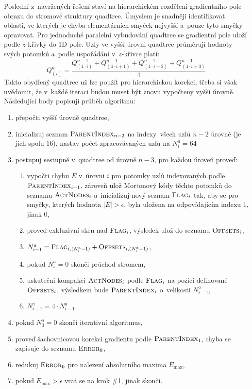 \documentclass[11pt,a4paper,oneside]{article}
\begin{document}
	Poslední z~navržených řešení staví na hierarchickém rozdělení gradientního pole obrazu do
	stromové struktury quadtree. Úmyslem je snadněji identifikovat oblasti, ve kterých je
	chyba elementárních smyček nejvyšší a~pouze tyto smyčky opravovat. Pro jednoduché paralelní
	vybudování quadtree se gradientní pole uloží podle $z$-křivky do 1D pole. Uzly ve vyšší
	úrovni quadtree průměrují hodnoty svých potomků a~podle uspořádání v~$z$-křivce platí:
	$$
		Q_{(i)}^n = \frac{Q_{(4 \cdot i)}^{n - 1} + Q_{(4 \cdot i + 1)}^{n - 1} +
		                  Q_{(4 \cdot i + 2)}^{n - 1} + Q_{(4 \cdot i + 3)}^{n - 1}}{4}
	$$
	Takto obydlený quadtree už lze použít pro hierarchickou korekci, třeba si však uvědomit,
	že v~každé iteraci budou muset být znovu vypočteny vyšší úrovně. Následující body popisují
	průběh algoritmu:
	\begin{enumerate}
		\item přepočti vyšší úrovně quadtree,
		\item inicializuj seznam $\textsc{ParentIndex}_{n - 2}$ na indexy~všech uzlů $n - 2$ úrovně (je jich spolu 16),
		      nastav počet zpracovávaných uzlů na $N_i^a = 64$
		\item postupuj sestupně v~quadtree od úrovně $n - 3$, pro každou úroveň proveď:
		\begin{enumerate}
			\item vypočti chybu $E$ v~úrovni $i$ pro potomky uzlů indexovaných podle $\textsc{ParentIndex}_{i + 1}$,
			      zároveň ulož Mortonový kódy těchto potomků do seznamu $\textsc{ActNodes}_i$ a~inicializuj
			      nový seznam $\textsc{Flag}_i$ tak, aby se pro smyčky, kterých hodnota $|E| > \epsilon$, byla
			      uložena na odpovídajícím indexu $1$, jinak $0$,
			\item proveď exkluzivní sken nad $\textsc{Flag}_i$, výsledek ulož do seznamu $\textsc{Offsets}_i$,
			\item $N_{i - 1}^a = \textsc{Flag}_{i, (N_i^a - 1)} + \textsc{Offsets}_{i, (N_i^a - 1)}$,
			\item pokud $N_i^a = 0$ skonči průchod stromem,
			\item uskutečni kompakci $\textsc{ActNodes}_i$ podle $\textsc{Flag}_i$ na pozici definované $\textsc{Offsets}_i$,
			      výsledkem bude $\textsc{ParentIndex}_i$ o~velikosti $N_{i - 1}^a$,
			\item $N_{i - 1}^a = 4 \cdot N_{i - 1}^a$.
		\end{enumerate}
		\item pokud $N_0^a = 0$ skonči iterativní algoritmus,
		\item proveď šachovnicovou korekci gradientu podle $\textsc{ParentIndex}_1$,
		      chyba se zapisuje do seznamu $\textsc{Error}_0$,
		\item redukuj $\textsc{Error}_0$ pro nalezení absolutního maxima $E_{\max}$,
		\item pokud $E_{\max} > \epsilon$ vrať se na krok \#1, jinak skonči.
	\end{enumerate}
\end{document}

